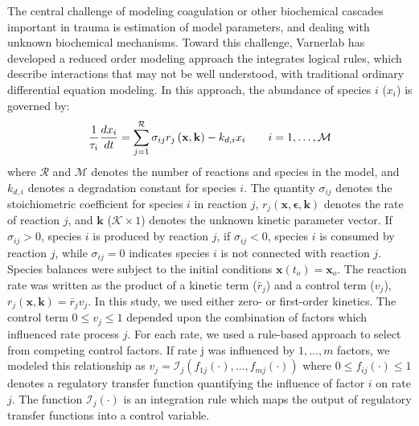 \documentclass[12pt]{article}
\begin{document}
The central challenge of modeling coagulation or other biochemical cascades important in trauma is estimation of model parameters, and dealing with unknown biochemical mechanisms.
Toward this challenge, Varnerlab has developed a reduced order modeling approach the integrates logical rules, which describe interactions that may not be
well understood, with traditional ordinary differential equation modeling.
In this approach, the abundance of species $i$ ($x_{i}$) is governed by:
\begin{equation}
	\frac{1}{\tau_{i}}\frac{dx_{i}}{dt}  =  \sum_{j = 1}^{\mathcal{R}}\sigma_{ij}r_{j}\left(\mathbf{x},\mathbf{k}\right) - k_{d,i}x_{i}\qquad{i=1,\hdots,\mathcal{M}}\\
\end{equation}
where $\mathcal{R}$ and $\mathcal{M}$ denotes the number of reactions and species in the model, and $k_{d,i}$ denotes a degradation constant for species $i$.
The quantity $\sigma_{ij}$ denotes the stoichiometric coefficient for species $i$ in reaction $j$,
$r_{j}\left(\mathbf{x},\mathbf{\epsilon},\mathbf{k}\right)$ denotes the rate of reaction $j$, and $\mathbf{k}$ ($\mathcal{K}\times{1}$) denotes the unknown kinetic parameter vector.
If $\sigma_{ij}>0$, species $i$ is produced by reaction $j$, if $\sigma_{ij}<0$, species $i$ is consumed by reaction $j$,
while $\sigma_{ij} = 0$ indicates species $i$ is not connected with reaction $j$.
Species balances were subject to the initial conditions $\mathbf{x}\left(t_{o}\right) = \mathbf{x}_{o}$.
The reaction rate was written as the product of a kinetic term ($\bar{r}_{j}$) and a control term ($v_{j}$), $r_{j}\left(\mathbf{x},\mathbf{k}\right) = \bar{r}_{j}v_{j}$.
In this study, we used either zero- or first-order kinetics.
The control term $0\leq v_{j}\leq 1$ depended upon the combination of factors which influenced rate process $j$.
For each rate, we used a rule-based approach to select from competing control factors.
If rate j was influenced by $1,\dots,m$ factors, we modeled this relationship as
$v_{j} = \mathcal{I}_{j}\left(f_{1j}\left(\cdot\right),\hdots,f_{mj}\left(\cdot\right)\right)$
where $0\leq f_{ij}\left(\cdot\right)\leq 1$ denotes a regulatory transfer function quantifying the influence of factor $i$ on rate $j$.
The function $\mathcal{I}_{j}\left(\cdot\right)$ is an integration rule which maps the output of regulatory transfer functions into a control
variable.
\end{document}
